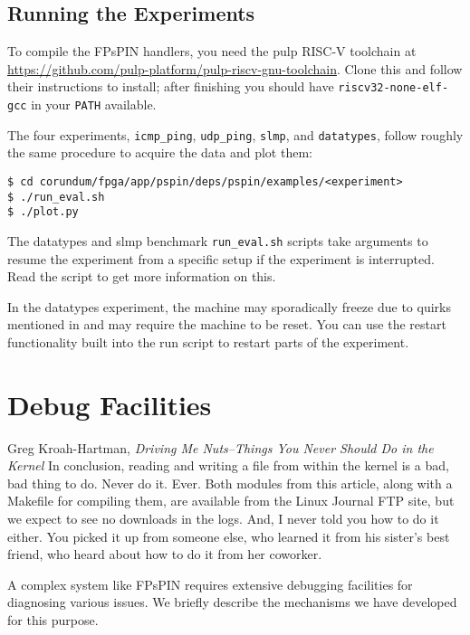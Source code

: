 \section{Running the Experiments}

To compile the FPsPIN handlers, you need the \ac{pulp} RISC-V toolchain at \url{https://github.com/pulp-platform/pulp-riscv-gnu-toolchain}.  Clone this and follow their instructions to install; after finishing you should have \texttt{riscv32-none-elf-gcc} in your \texttt{PATH} available. 

The four experiments, \texttt{icmp\_ping}, \texttt{udp\_ping}, \texttt{slmp}, and \texttt{datatypes}, follow roughly the same procedure to acquire the data and plot them:

\begin{verbatim}
$ cd corundum/fpga/app/pspin/deps/pspin/examples/<experiment>
$ ./run_eval.sh
$ ./plot.py
\end{verbatim}

The datatypes and \ac{slmp} benchmark \texttt{run\_eval.sh} scripts take arguments to resume the experiment from a specific setup if the experiment is interrupted.  Read the script to get more information on this.

In the datatypes experiment, the machine may sporadically freeze due to quirks mentioned in  and may require the machine to be reset.  You can use the restart functionality built into the run script to restart parts of the experiment.

\chapter{Debug Facilities}
\begin{chapquote}{Greg Kroah-Hartman, \textit{Driving Me Nuts--Things You Never Should Do in the Kernel}}
In conclusion, reading and writing a file from within the kernel is a bad, bad thing to do. Never do it. Ever. Both modules from this article, along with a Makefile for compiling them, are available from the Linux Journal FTP site, but we expect to see no downloads in the logs. And, I never told you how to do it either. You picked it up from someone else, who learned it from his sister's best friend, who heard about how to do it from her coworker.
\end{chapquote}

A complex system like FPsPIN requires extensive debugging facilities for diagnosing various issues.  We briefly describe the mechanisms we have developed for this purpose.

